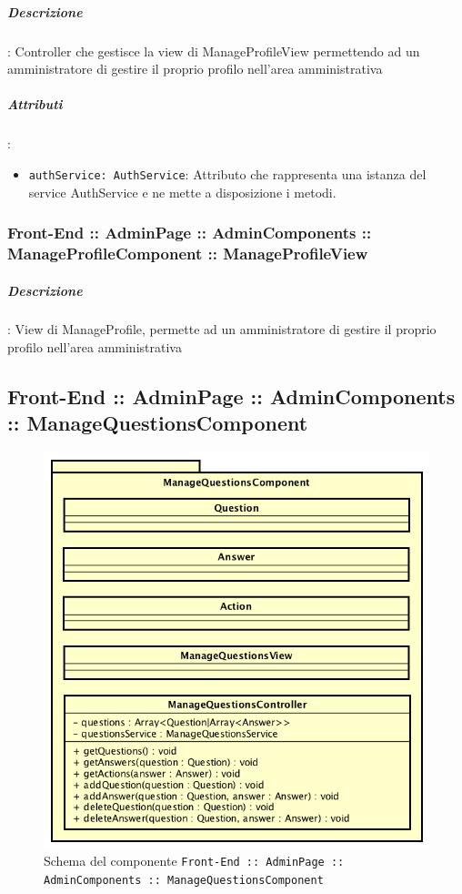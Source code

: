 \documentclass[../ManualeSviluppatore_v2.0.0.tex]{subfiles}
\begin{document}
					\subparagraph{Descrizione}: Controller che gestisce la view di ManageProfileView permettendo ad un amministratore di gestire il proprio profilo nell'area amministrativa
					\subparagraph{Attributi}:
					\begin{itemize}
						\item \texttt{authService: AuthService}: Attributo che rappresenta una istanza del service AuthService e ne mette a disposizione i metodi.
					\end{itemize}
				\subsubsection{Front-End :: AdminPage :: AdminComponents :: ManageProfileComponent :: ManageProfileView}

					\subparagraph{Descrizione}: View di ManageProfile, permette ad un amministratore di gestire il proprio profilo nell'area amministrativa


	\newpage
	\subsection{Front-End :: AdminPage :: AdminComponents :: ManageQuestionsComponent}
	\begin{figure}[!h]
		\centering
		\includegraphics[scale=0.6]{Architettura/Front-End/AdminPage/AdminComponents/ManageQuestionsComponent.png}
		\caption{Schema del componente \texttt{Front-End :: AdminPage :: AdminComponents :: ManageQuestionsComponent}}
	\end{figure}
\end{document}
